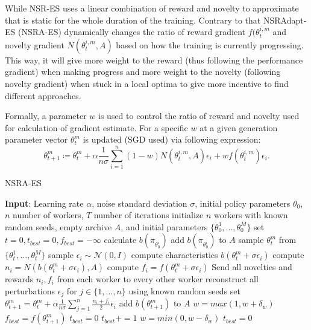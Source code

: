 While NSR-ES uses a linear combination of reward and novelty to approximate that is static for the whole duration of the training. Contrary to that NSRAdapt-ES (NSRA-ES) dynamically changes the ratio of reward gradient $f(\theta_t^{i,m}$ and novelty gradient $N(\theta_t^{i,m},A)$ based on how the training is currently progressing. This way, it will give more weight to the reward (thus following the performance gradient) when making progress and more weight to the novelty (following novelty gradient) when stuck in a local optima to give more incentive to find different approaches. 

Formally, a parameter $w$ is used to control the ratio of reward and novelty used for calculation of gradient estimate. For a specific $w$ at a given generation parameter vector $\theta_t^m$ is updated (SGD used) via following expression: 
\begin{equation}
    \theta^m_{t+1}\coloneqq\theta^m_t + \alpha \frac{1}{n\sigma}\sum_{i=1}^n (1-w)N(\theta_t^{i,m},A)\epsilon_i+wf(\theta_t^{i,m})\epsilon_i.
\end{equation}

\begin{algorithm}
    \begin{algorithmic}[1]
    \caption{NSRA-ES}
    \label{alg:nsra-es}
        \State \textbf{Input}: Learning rate $\alpha$, noise standard deviation $\sigma$, initial policy parameters $\theta_0$, $n$ number of workers, $T$ number of iterations
        \State initialize $n$ workers with known random seeds, empty archive $A$, and initial parameters $\{\theta^1_0,\dots, \theta^M_0\}$
        \State set $t=0, t_{best}=0, f_{best}=-\infty$
            \State calculate $b(\pi_{\theta^i_0})$
            \State add $b(\pi_{\theta^i_0})$ to $A$
        \EndFor
            \State sample $\theta_t^m$ from $\{\theta^1_t,\dots, \theta^M_t\}$
                \State sample $\epsilon_i \sim \mathcal{N}(0,I)$ 
                \State compute characteristics $b(\theta^m_t+\sigma\epsilon_i)$
                \State compute $n_i = N(b(\theta^m_t+\sigma\epsilon_i), A)$
                \State compute $f_i = f(\theta^m_t+\sigma\epsilon_i)$
            \EndFor
            \State Send all novelties and rewards $n_i, f_i$ from each worker to every other worker
                \State reconstruct all perturbations $\epsilon_j $ for $j \in \{1,\dots,n\}$ using known random seeds
                \State set $\theta^m_{t+1} = \theta_t^m + \alpha \frac{1}{n\sigma}\sum_{j=1}^n\frac{n_i+f_i}{2}\epsilon_i$
                \State add $b(\theta^m_{t+1})$ to $A$
            \EndFor
            \State $w=max(1, w+\delta_w)$
            \State $f_{best} = f(\theta^m_{t+1})$
            \State $t_{best} = 0$
        \Else
            \State $t_{best}+=1$
        \EndIf
            \State $w=min(0, w-\delta_w)$
            \State $t_{best} = 0$
        \Else
        \EndIf
        \EndFor
    \end{algorithmic}
\end{algorithm}


\cite{conti2018} 
